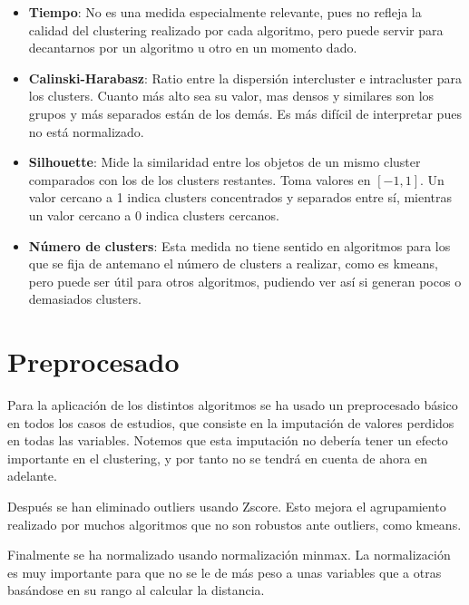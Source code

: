 \begin{itemize}
\item \textbf{Tiempo}: No es una medida especialmente relevante, pues no refleja la calidad del clustering realizado por cada algoritmo, pero puede servir para decantarnos por un algoritmo u otro en un momento dado.
\item \textbf{Calinski-Harabasz}: Ratio entre la dispersión intercluster e intracluster para los clusters. Cuanto más alto sea su valor, mas densos y similares son los grupos y más separados están de los demás. Es más difícil de interpretar pues no está normalizado.
\item \textbf{Silhouette}: Mide la similaridad entre los objetos de un mismo cluster comparados con los de los clusters restantes. Toma valores en $[-1, 1]$. Un valor cercano a 1 indica clusters concentrados y separados entre sí, mientras un valor cercano a 0 indica clusters cercanos.
\item \textbf{Número de clusters}: Esta medida no tiene sentido en algoritmos para los que se fija de antemano el número de clusters a realizar, como es kmeans, pero puede ser útil para otros algoritmos, pudiendo ver así si generan pocos o demasiados clusters.  
\end{itemize}

\section{Preprocesado}

Para la aplicación de los distintos algoritmos se ha usado un preprocesado básico en todos los casos de estudios, que consiste en la imputación de valores perdidos en todas las variables. Notemos que esta imputación no debería tener un efecto importante en el clustering, y por tanto no se tendrá en cuenta de ahora en adelante.

Después se han eliminado outliers usando Zscore. Esto mejora el agrupamiento realizado por muchos algoritmos que no son robustos ante outliers, como kmeans.

Finalmente se ha normalizado usando normalización minmax. La normalización es muy importante para que no se le de más peso a unas variables que a otras basándose en su rango al calcular la distancia.


